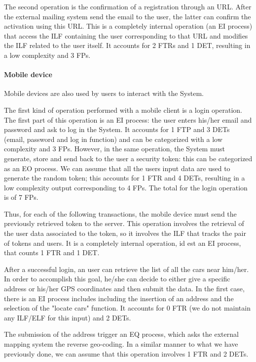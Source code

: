 The second operation is the confirmation of a registration through an URL. After the external mailing system send the email to the user, the latter can confirm the activation using this URL. This is a completely internal operation (an EI process) that access the ILF containing the user corresponding to that URL and modifies the ILF related to the user itself. It accounts for 2 FTRs and 1 DET, resulting in a low complexity and 3 FPs.
\smallskip

\paragraph{Mobile device}
Mobile devices are also used by users to interact with the System. 

The first kind of operation performed with a mobile client is a login operation. 
The first part of this operation is an EI process: the user enters his/her email and password and ask to log in the System. It accounts for 1 FTP and 3 DETs (email, password and log in function) and can be categorized with a low complexity and 3 FPs.
However, in the same operation, the System must generate, store and send back to the user a security token: this can be categorized as an EO process. We can assume that all the users input data are used to generate the random token; this accounts for 1 FTR and 4 DETs, resulting in a low complexity output corresponding to 4 FPs.
The total for the login operation is of 7 FPs.
\smallskip

Thus, for each of the following transactions, the mobile device must send the previously retrieved token to the server. This operation involves the retrieval of the user data associated to the token, so it involves the ILF that tracks the pair of tokens and users. It is a completely internal operation, id est an EI process, that counts 1 FTR and 1 DET.
\smallskip

After a successful login, an user can retrieve the list of all the cars near him/her. In order to accomplish this goal, he/she can decide to either give a specific address or his/her GPS coordinates and then submit the data.
In the first case, there is an EI process includes including the insertion of an address and the selection of the "locate cars" function. It accounts for 0 FTR (we do not maintain any ILF/ELF for this input) and 2 DETs.
 
The submission of the address trigger an EQ process, which asks the external mapping system the reverse geo-coding. In a similar manner to what we have previously done, we can assume that this operation involves 1 FTR and 2 DETs.

